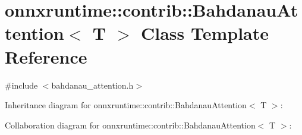\hypertarget{classonnxruntime_1_1contrib_1_1BahdanauAttention}{}\section{onnxruntime\+:\+:contrib\+:\+:Bahdanau\+Attention$<$ T $>$ Class Template Reference}
\label{classonnxruntime_1_1contrib_1_1BahdanauAttention}


{\ttfamily \#include $<$bahdanau\+\_\+attention.\+h$>$}



Inheritance diagram for onnxruntime\+:\+:contrib\+:\+:Bahdanau\+Attention$<$ T $>$\+:


Collaboration diagram for onnxruntime\+:\+:contrib\+:\+:Bahdanau\+Attention$<$ T $>$\+:
